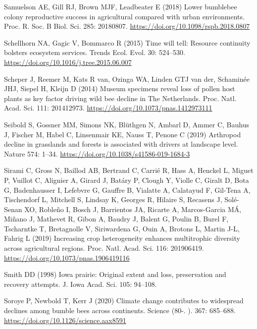 \documentclass[11pt,]{article}
\begin{document}
\leavevmode\hypertarget{ref-Samuelson2018}{}%
Samuelson AE, Gill RJ, Brown MJF, Leadbeater E (2018) Lower bumblebee
colony reproductive success in agricultural compared with urban
environments. Proc. R. Soc. B Biol. Sci. 285: 20180807.
\url{https://doi.org/10.1098/rspb.2018.0807}

\leavevmode\hypertarget{ref-Schellhorn2015c}{}%
Schellhorn NA, Gagic V, Bommarco R (2015) Time will tell: Resource
continuity bolsters ecosystem services. Trends Ecol. Evol. 30: 524--530.
\url{https://doi.org/10.1016/j.tree.2015.06.007}

\leavevmode\hypertarget{ref-Scheper2014}{}%
Scheper J, Reemer M, Kats R van, Ozinga WA, Linden GTJ van der,
Schaminée JHJ, Siepel H, Kleijn D (2014) Museum specimens reveal loss of
pollen host plants as key factor driving wild bee decline in The
Netherlands. Proc. Natl. Acad. Sci. 111: 201412973.
\url{https://doi.org/10.1073/pnas.1412973111}

\leavevmode\hypertarget{ref-Seibold2019}{}%
Seibold S, Gossner MM, Simons NK, Blüthgen N, Ambarl D, Ammer C, Bauhus
J, Fischer M, Habel C, Linsenmair KE, Nauss T, Penone C (2019) Arthropod
decline in grasslands and forests is associated with drivers at
landscape level. Nature 574: 1--34.
\url{https://doi.org/10.1038/s41586-019-1684-3}

\leavevmode\hypertarget{ref-Sirami2019}{}%
Sirami C, Gross N, Baillod AB, Bertrand C, Carrié R, Hass A, Henckel L,
Miguet P, Vuillot C, Alignier A, Girard J, Batáry P, Clough Y, Violle C,
Giralt D, Bota G, Badenhausser I, Lefebvre G, Gauffre B, Vialatte A,
Calatayud F, Gil-Tena A, Tischendorf L, Mitchell S, Lindsay K, Georges
R, Hilaire S, Recasens J, Solé-Senan XO, Robleño I, Bosch J, Barrientos
JA, Ricarte A, Marcos-Garcia MÁ, Miñano J, Mathevet R, Gibon A, Baudry
J, Balent G, Poulin B, Burel F, Tscharntke T, Bretagnolle V, Siriwardena
G, Ouin A, Brotons L, Martin J-L, Fahrig L (2019) Increasing crop
heterogeneity enhances multitrophic diversity across agricultural
regions. Proc. Natl. Acad. Sci. 116: 201906419.
\url{https://doi.org/10.1073/pnas.1906419116}

\leavevmode\hypertarget{ref-Smith1998}{}%
Smith DD (1998) Iowa prairie: Original extent and loss, preservation and
recovery attempts. J. Iowa Acad. Sci. 105: 94--108.

\leavevmode\hypertarget{ref-Soroye2020}{}%
Soroye P, Newbold T, Kerr J (2020) Climate change contributes to
widespread declines among bumble bees across continents. Science (80-.
). 367: 685--688. \url{https://doi.org/10.1126/science.aax8591}
\end{document}
